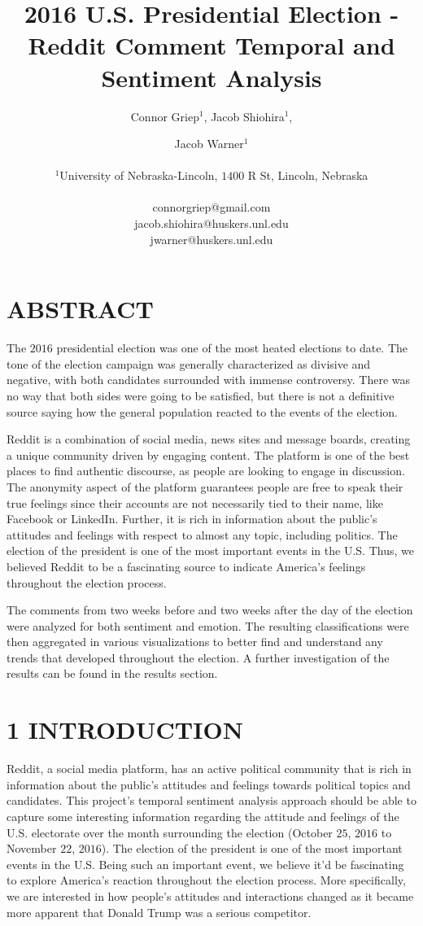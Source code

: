 \documentclass[letterpaper]{article}
\title{2016 U.S. Presidential Election - Reddit Comment Temporal and Sentiment Analysis}
\author{Connor Griep$^{1}$, Jacob Shiohira$^{1}$, \and Jacob Warner$^{1}$ \\
\mbox{}\\
$^1$University of Nebraska-Lincoln, $1400$ R St, Lincoln, Nebraska \\
\mbox{}\\
connorgriep@gmail.com \\
jacob.shiohira@huskers.unl.edu \\
jwarner@huskers.unl.edu }
\begin{document}
\maketitle

\section{ABSTRACT}
The $2016$ presidential election was one of the most heated elections to date. The tone of the election campaign was generally characterized as divisive and negative, with both candidates surrounded with immense controversy. There was no way that both sides were going to be satisfied, but there is not a definitive source saying how the general population reacted to the events of the election. 

Reddit is a combination of social media, news sites and message boards, creating a unique community driven by engaging content. The platform is one of the best places to find authentic discourse, as people are looking to engage in discussion. The anonymity aspect of the platform guarantees people are free to speak their true feelings since their accounts are not necessarily tied to their name, like Facebook or LinkedIn. Further, it is rich in information about the public’s attitudes and feelings with respect to almost any topic, including politics. The election of the president is one of the most important events in the U.S. Thus, we believed Reddit to be a fascinating source to indicate America's feelings throughout the election process.

The comments from two weeks before and two weeks after the day of the election were analyzed for both sentiment and emotion. The resulting classifications were then aggregated in various visualizations to better find and understand any trends that developed throughout the election. A further investigation of the results can be found in the results section.


\section{1 INTRODUCTION}

Reddit, a social media platform, has an active political community that is rich in information about the public's attitudes and feelings towards political topics and candidates. This project’s temporal sentiment analysis approach should be able to capture some interesting information regarding the attitude and feelings of the U.S. electorate over the month surrounding the election (October $25$, $2016$ to November $22$, $2016$). The election of the president is one of the most important events in the U.S. Being such an important event, we believe it’d be fascinating to explore America’s reaction throughout the election process. More specifically, we are interested in how people’s attitudes and interactions changed as it became more apparent that Donald Trump was a serious competitor.
\end{document}
